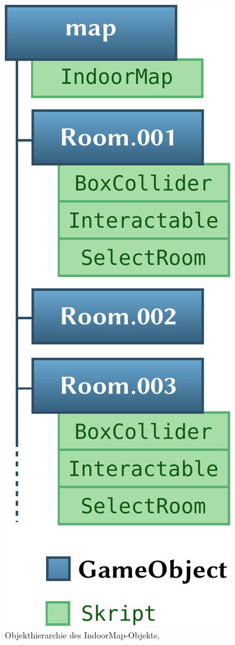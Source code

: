 \begin{figure}
    \centering
    \includegraphics[width=0.85\linewidth]{figures/unity_indoor_map}
    \caption{Objekthierarchie des IndoorMap-Objekts,}
    \label{fig:room_hierarchy}
\end{figure}
